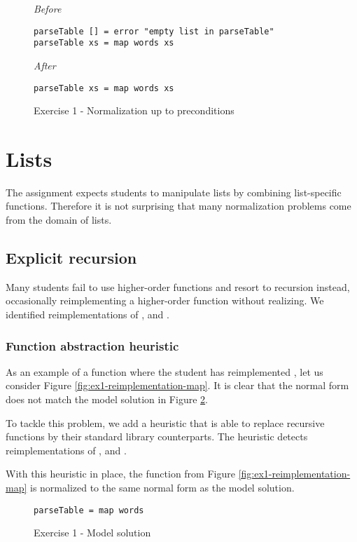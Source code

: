 \begin{figure}
\centering
\emph{Before}
\begin{verbatim}
parseTable [] = error "empty list in parseTable"
parseTable xs = map words xs
\end{verbatim}
\bigskip
\emph{After}
\begin{verbatim}
parseTable xs = map words xs
\end{verbatim}
\caption{Exercise 1 - Normalization up to preconditions}
\label{fig:preconditions-remove-base-case}
\end{figure}

\section{Lists}

The assignment expects students to manipulate lists by combining list-specific functions. Therefore it is not surprising that many normalization problems come from the domain of lists.

\subsection{Explicit recursion}

Many students fail to use higher-order functions and resort to recursion instead, occasionally reimplementing a higher-order function without realizing. We identified reimplementations of ,  and .

\subsubsection{Function abstraction heuristic}

As an example of a function where the student has reimplemented , let us consider Figure \ref{fig:ex1-reimplementation-map}.  It is clear that the normal form does not match the model solution in Figure \ref{fig:ex1-model-solution}.

To tackle this problem, we add a heuristic that is able to replace recursive functions by their standard library counterparts. The heuristic detects reimplementations of ,  and .

With this heuristic in place, the function from Figure \ref{fig:ex1-reimplementation-map} is normalized to the same normal form as the model solution.

\begin{figure}
\begin{verbatim}
parseTable = map words
\end{verbatim}
\caption{Exercise 1 - Model solution}
\label{fig:ex1-model-solution}
\end{figure}

